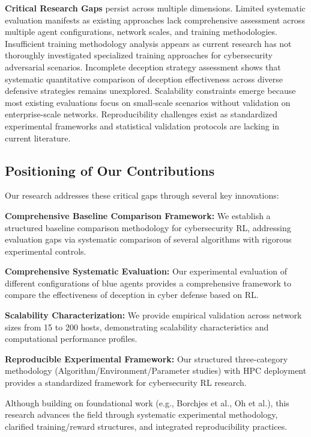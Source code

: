 \documentclass[12pt,oneside]{article}
\begin{document}
\textbf{Critical Research Gaps} persist across multiple dimensions. Limited systematic evaluation manifests as existing approaches lack comprehensive assessment across multiple agent configurations, network scales, and training methodologies. Insufficient training methodology analysis appears as current research has not thoroughly investigated specialized training approaches for cybersecurity adversarial scenarios. Incomplete deception strategy assessment shows that systematic quantitative comparison of deception effectiveness across diverse defensive strategies remains unexplored. Scalability constraints emerge because most existing evaluations focus on small-scale scenarios without validation on enterprise-scale networks. Reproducibility challenges exist as standardized experimental frameworks and statistical validation protocols are lacking in current literature.

\subsection{Positioning of Our Contributions}

Our research addresses these critical gaps through several key innovations:

\textbf{Comprehensive Baseline Comparison Framework:} We establish a structured baseline comparison methodology for cybersecurity RL, addressing evaluation gaps via systematic comparison of several algorithms with rigorous experimental controls.

\textbf{Comprehensive Systematic Evaluation:} Our experimental evaluation of different configurations of blue agents provides a comprehensive framework to compare the effectiveness of deception in cyber defense based on RL.

\textbf{Scalability Characterization:} We provide empirical validation across network sizes from 15 to 200 hosts, demonstrating scalability characteristics and computational performance profiles.

\textbf{Reproducible Experimental Framework:} Our structured three-category methodology (Algorithm/Environment/Parameter studies) with HPC deployment provides a standardized framework for cybersecurity RL research.

Although building on foundational work (e.g., Borchjes et al., Oh et al.), this research advances the field through systematic experimental methodology, clarified training/reward structures, and integrated reproducibility practices.
\end{document}
